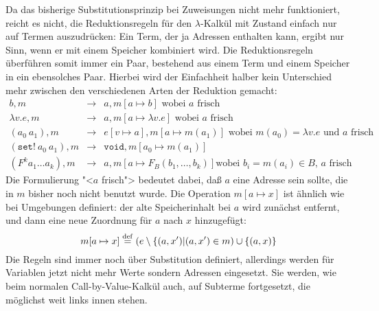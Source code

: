 Da das bisherige Substitutionsprinzip bei Zuweisungen nicht mehr funktioniert, reicht es
nicht, die Reduktionsregeln für den $\lambda$-Kalkül mit Zustand
einfach nur auf Termen auszudrücken: Ein Term, der ja Adressen
enthalten kann, ergibt nur Sinn, wenn er mit einem Speicher kombiniert
wird.  Die Reduktionsregeln überführen somit immer ein Paar, bestehend aus
einem Term und einem Speicher in ein ebensolches Paar.  Hierbei wird der
Einfachheit halber kein Unterschied mehr zwischen den verschiedenen
Arten der Reduktion gemacht:
%
\begin{eqnarray*}
  b, m &\rightarrow& a, m[a\mapsto b] \textrm{ wobei $a$ frisch}
  \\
  \lambda v.e, m &\rightarrow&
  a, m[a\mapsto \lambda v.e]  \textrm{ wobei $a$ frisch}
  \\
  (a_0~a_1), m &\rightarrow& e[v\mapsto a], m[a\mapsto m(a_1)]
  \textrm{ wobei $m(a_0) = \lambda v.e$ und $a$ frisch} 
  \\
  (\mathtt{set!}~a_0~a_1), m &\rightarrow& \mathtt{void}, m[a_0\mapsto m(a_1)]
  \\
  (F^k a_1 \ldots a_k), m &\rightarrow& a, m[a\mapsto F_B(b_1, \ldots, b_k)] \textrm{
    wobei $b_i = m(a_i) \in B$, $a$ frisch}
\end{eqnarray*}
%
Die Formulierung "<$a$ frisch"> bedeutet dabei, daß $a$ eine Adresse
sein sollte, die in $m$ bisher noch nicht benutzt wurde.  Die Operation
$m[a\mapsto x]$ ist ähnlich wie bei Umgebungen definiert: der alte
Speicherinhalt bei $a$ wird zunächst entfernt, und dann eine neue
Zuordnung für $a$ nach $x$ hinzugefügt:
%
\begin{displaymath}
  m[a\mapsto x] \stackrel{\rm def}{=} (e \setminus \{ (a, x') | (a, x') \in m) \cup \{
    (a, x) \}
\end{displaymath}
%
Die Regeln sind immer noch über Substitution definiert, allerdings
werden für Variablen jetzt nicht mehr Werte sondern Adressen
eingesetzt.  Sie werden, wie beim normalen Call-by-Value-Kalkül auch,
auf Subterme fortgesetzt, die möglichst weit links innen stehen.

